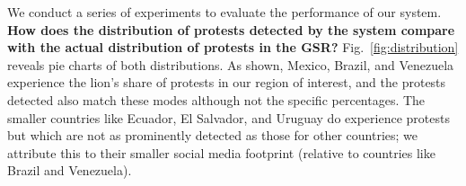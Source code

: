 We conduct a series of experiments to evaluate the performance of our system.\\

\noindent
{\bf How does the distribution of protests detected by the system compare with the
actual distribution of protests in the GSR?}
Fig.~\ref{fig:distribution} reveals pie charts of both distributions. As shown, Mexico, Brazil, and Venezuela
experience the lion's share of protests in our region of interest, and the protests detected also match these modes
although not the specific percentages. The smaller countries like Ecuador, El Salvador, and Uruguay do experience
protests but which are not as prominently detected as those for other countries; we attribute this to their smaller
social media footprint (relative to countries like Brazil and Venezuela).\\

